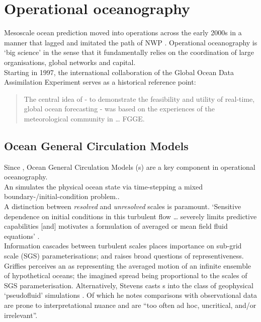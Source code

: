 \section{Operational oceanography}
\label{S:operational_oceanography}

Mesoscale ocean prediction moved into operations across the early 2000s in a manner that lagged and imitated the path of NWP \citep{Harper:2008ub}. Operational oceanography is `big science' \citep{Petersen:2012tr} in the sense that it fundamentally relies on the coordination of large organisations, global networks and capital. \\
Starting in 1997, the international collaboration of the Global Ocean Data Assimilation Experiment \GODAE{} serves as a historical reference point:

\begin{quote}
  The central idea of \GODAE{} - to demonstrate the feasibility and utility of real-time, global ocean forecasting - was based on the experiences of the meteorological community in \dots{} FGGE. \citep{Bell:2009uv}
\end{quote}


\subsection{Ocean General Circulation Models}

Since \GODAE{}, Ocean General Circulation Models (\OGCM{}s) are a key component in operational oceanography.\\

An \OGCM{} simulates the physical ocean state via time-stepping a mixed boundary-/initial-condition problem.\citep{Griffies:2004vs}.\\
A distinction between \emph{resolved} and \emph{unresolved} scales is paramount.  `Sensitive dependence on initial conditions in this turbulent flow \dots{} severely limits predictive capabilities [and] motivates a formulation of averaged or mean field fluid equations' \citep[Sec 2.5]{Griffies:2004vs}.\\


Information cascades between turbulent scales places importance on sub-grid scale (SGS) parameterisations; and raises broad questions of representiveness.\\
Griffies perceives an \OGCM{} as representing the averaged motion of an infinite ensemble of hypothetical oceans; the imagined spread being proportional to the scales of SGS parameterisation.
Alternatively, Stevens casts \OGCM{}s into the class of geophysical `pseudofluid' simulations \citep{Stevens:2001kb}. Of which he notes comparisons with observational data are prone to interpretational nuance and are ``too often ad hoc, uncritical, and/or irrelevant''\citep[pp 286]{Stevens:2001kb}. \\


